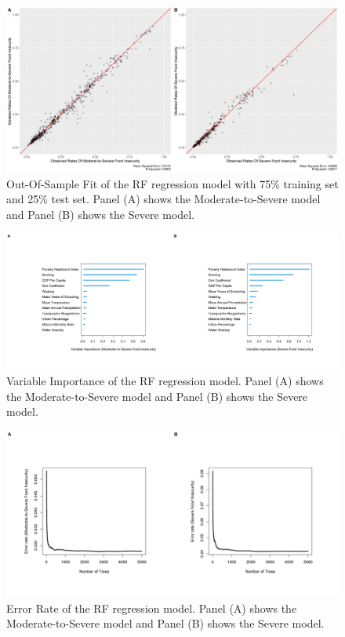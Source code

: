 \documentclass{article}
\begin{document}
\begin{figure}[H]
  \centering
  \includegraphics[width=\linewidth]{img/model/out-sample_rf.png}
  \caption{Out-Of-Sample Fit of the RF regression model with 75\% training set and 25\% test set. Panel (A) shows the Moderate-to-Severe model and Panel (B) shows the Severe model.}
  \label{fig:rf_out-sample}
\end{figure}

\begin{figure}[H]
  \centering
  \includegraphics[width=\linewidth]{img/model/vimp_rf.png}
  \caption{Variable Importance of the RF regression model. Panel (A) shows the Moderate-to-Severe model and Panel (B) shows the Severe model.}
  \label{fig:rf_vimp}
\end{figure}

\begin{figure}[H]
  \centering
  \includegraphics[width=\linewidth]{img/model/error_rf.png}
  \caption{Error Rate of the RF regression model. Panel (A) shows the Moderate-to-Severe model and Panel (B) shows the Severe model.}
  \label{fig:rf_error}
\end{figure}
\end{document}

